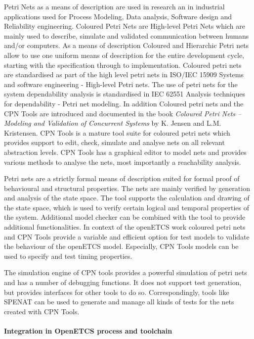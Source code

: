 Petri Nets as a means of description are used in research an in industrial applications used for Process Modeling, Data analysis, Software design and Reliability engineering. Coloured Petri Nets are  High-level Petri Nets which are mainly used to describe, simulate and validated communication between humans and/or computers. As a means of description Coloured and  Hierarchic Petri nets allow to use one uniform means of description for the entire development cycle, starting with  the specification through to  implementation. 
Coloured petri nets are standardised as part of the high level petri nets in ISO/IEC 15909 Systems and software engineering - High-level Petri nets. The use of petri nets for the system dependability analysis is standardised in IEC 62551 Analysis techniques for dependability - Petri net modeling. In addition Coloured petri nets and the CPN Tools are introduced and documented in the book \textit{Coloured Petri Nets -- Modeling and Validation of Concurrent Systems} by K. Jensen and L.M. Kristensen. CPN Tools is a mature tool suite for coloured petri nets which provides support to edit, check, simulate and analyse nets on all relevant abstraction levels. CPN Tools has a graphical editor to model nets and provides various methods to analyse the nets, most importantly a reachability analysis. 

Petri nets are a strictly formal means of description suited for formal proof of behavioural and structural properties. The nets are mainly verified by generation and analysis of the state space. The tool supports the calculation and drawing of the state space, which is used to verify certain logical and temporal properties of the system. Additional model checker can be combined with the tool to provide additional functionalities. In context of the openETCS work coloured petri nets and CPN Tools provide a variable and efficient option for test models to validate the behaviour of the openETCS model. Especially, CPN Tools models can be used to specify and test timing properties.

The simulation engine of CPN tools provides a powerful simulation of petri nets and has a number of debugging functions. It does not support test generation, but provides interfaces for other tools to do so. Correspondingly, tools like SPENAT can be used to generate and manage all kinds of tests for the nets created with CPN Tools. 

\paragraph{Integration in OpenETCS process and toolchain}

